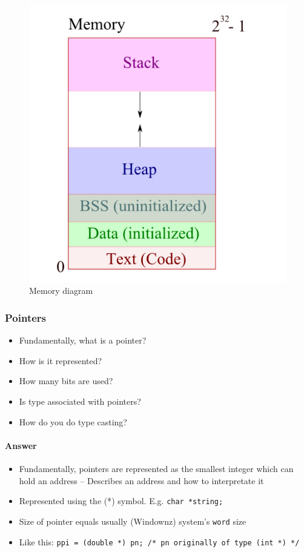 \begin{figure}[H]
  \centering
  \includegraphics[scale=0.6]{images/memory_diagram}
  \caption{Memory diagram}
\label{fig:stack-heap}
\end{figure}

\subsubsection*{Pointers}

\begin{itemize}
\item Fundamentally, what is a pointer?
\item How is it represented?
\item How many bits are used?
\item Is type associated with pointers?
\item How do you do type casting?
\end{itemize}

\paragraph{Answer}

\begin{itemize}
\item  Fundamentally, pointers are represented as the smallest integer which can hold an address
– Describes an address and how to interpretate it
\item Represented using the (*) symbol. E.g. {\tt char *string; }
\item Size of pointer equals usually (Windownz) system's \texttt{word} size
\item Like this: {\tt ppi = (double *) pn; /* pn originally of type (int *) */ }
\end{itemize}
